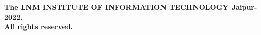 \thispagestyle{empty}
\vfill
\begin{center}
\vspace*{\fill} \textcopyright \textbf{The LNM INSTITUTE OF INFORMATION TECHNOLOGY Jaipur-2022.}\\
\textbf{All rights reserved.}
\end{center}
\clearpage
